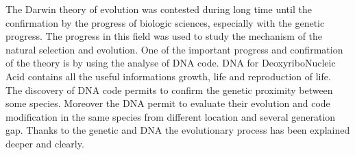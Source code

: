 The Darwin theory of evolution was contested during long time until the confirmation by the progress of biologic sciences, especially with the genetic progress. The progress in this field was used to study the mechanism of the natural selection and evolution. One of the important progress and confirmation of the theory is by using the analyse of DNA code. DNA for DeoxyriboNucleic Acid contains all the useful informations growth, life and reproduction of life.   \\
The discovery of DNA code permits to confirm the genetic proximity between some species. Moreover the DNA permit to evaluate their evolution and code modification in the same species from different location and several generation gap. %
Thanks to the genetic  and DNA the evolutionary process has been explained deeper and clearly. 



